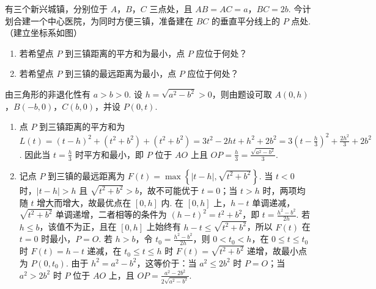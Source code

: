 \begin{problem}
有三个新兴城镇，分别位于 \(A\)，\(B\)，\(C\) 三点处，且 \(AB=AC=a\)，\(BC=2b\). 今计划合建一个中心医院，为同时方便三镇，准备建在 \(BC\) 的垂直平分线上的 \(P\) 点处.（建立坐标系如图）

\begin{enumerate}
\item 若希望点 \(P\) 到三镇距离的平方和为最小，点 \(P\) 应位于何处？
\item 若希望点 \(P\) 到三镇的最远距离为最小，点 \(P\) 应位于何处？
\end{enumerate}

\begin{solution}
由三角形的非退化性有 \(a>b>0\). 设 \(h=\sqrt{a^2-b^2}>0\)，则由题设可取 \(A(0,h)\)，\(B(-b,0)\)，\(C(b,0)\)，并设 \(P(0,t)\).
\begin{enumerate}
\item 点 \(P\) 到三镇距离的平方和为 \(L(t)=(t-h)^2+(t^2+b^2)+(t^2+b^2)=3t^2-2ht+h^2+2b^2=3\left(t-\frac h3\right)^2+\frac{2h^2}{3}+2b^2\). 因此当 \(t=\frac h3\) 时平方和最小，即 \(P\) 位于 \(AO\) 上且 \(OP=\frac h3=\frac{\sqrt{a^2-b^2}}3\).
\item 记点 \(P\) 到三镇的最远距离为 \(F(t)=\max\left\{|t-h|,\sqrt{t^2+b^2}\right\}\). 当 \(t<0\) 时，\(|t-h|>h\) 且 \(\sqrt{t^2+b^2}>b\)，故不可能优于 \(t=0\)；当 \(t>h\) 时，两项均随 \(t\) 增大而增大，故最优点在 \([0,h]\) 内. 在 \([0,h]\) 上，\(h-t\) 单调递减，\(\sqrt{t^2+b^2}\) 单调递增，二者相等的条件为 \((h-t)^2=t^2+b^2\)，即 \(t=\frac{h^2-b^2}{2h}\). 若 \(h\leq b\)，该值不为正，且在 \([0,h]\) 上始终有 \(h-t\leq\sqrt{t^2+b^2}\)，所以 \(F(t)\) 在 \(t=0\) 时最小，\(P=O\). 若 \(h>b\)，令 \(t_0=\frac{h^2-b^2}{2h}\)，则 \(0<t_0<h\)，在 \(0\leq t\leq t_0\) 时 \(F(t)=h-t\) 递减，在 \(t_0\leq t\leq h\) 时 \(F(t)=\sqrt{t^2+b^2}\) 递增，故最小点为 \(P(0,t_0)\). 由于 \(h^2=a^2-b^2\)，这等价于：当 \(a^2\leq2b^2\) 时 \(P=O\)；当 \(a^2>2b^2\) 时 \(P\) 位于 \(AO\) 上，且 \(\displaystyle OP=\frac{a^2-2b^2}{2\sqrt{a^2-b^2}}\).
\end{enumerate}
\end{solution}
\end{problem}

